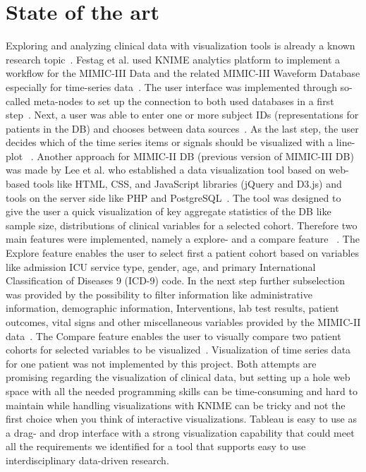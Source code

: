 \documentclass[aac,crcready]{iosart2x}
\begin{document}
\section{State of the art}\label{s2}
%
Exploring and analyzing clinical data with visualization tools is already a known research topic~\cite{Caban.2015, Sittig.2015, UnberathPhilipp.2019, Festag.2019}. Festag et al. used KNIME analytics platform to implement a workflow for the MIMIC-III Data and the related MIMIC-III Waveform Database especially for time-series data~\cite{Festag.2019}. The user interface was implemented through so-called meta-nodes to set up the connection to both used databases in a first step~\cite{Festag.2019}. Next, a user was able to enter one or more subject IDs (representations for patients in the DB) and chooses between data sources~\cite{Festag.2019}. As the last step, the user decides which of the time series items or signals should be visualized with a line-plot ~\cite{Festag.2019}.
Another approach for MIMIC-II DB (previous version of MIMIC-III DB) was made by Lee et al. who established a data visualization tool based on web-based tools like HTML, CSS, and JavaScript libraries (jQuery and D3.js) and tools on the server side like PHP and PostgreSQL~\cite{Lee.2016}. The tool was designed to give the user a quick visualization of key aggregate statistics of the DB like sample size, distributions of clinical variables for a selected cohort. Therefore two main features were implemented, namely a explore- and a compare feature ~\cite{Lee.2016}. The Explore feature enables the user to select first a patient cohort based on variables like admission ICU service type, gender, age, and primary International Classification of Diseases 9 (ICD-9) code. In the next step further subselection was provided by the possibility to filter information like administrative information, demographic information, Interventions, lab test results, patient outcomes, vital signs and other miscellaneous variables provided by the MIMIC-II data~\cite{Lee.2016}. The Compare feature enables the user to visually compare two patient cohorts for
selected variables to be visualized~\cite{Lee.2016}. Visualization of time series data for one patient was not implemented by this project. Both attempts are promising regarding the visualization of clinical data, but setting up a hole web space with all the needed programming skills can be time-consuming and hard to maintain while handling visualizations with KNIME can be tricky and not the first choice when you think of interactive visualizations. Tableau is easy to use as a drag- and drop interface with a strong visualization capability that could meet all the requirements we identified for a tool that supports easy to use interdisciplinary data-driven research.
 
\end{document}
